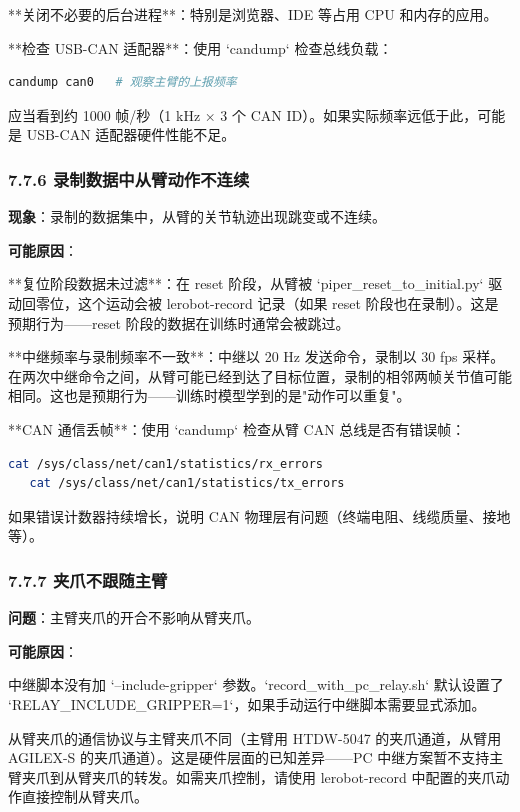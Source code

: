 \documentclass[UTF8,a4paper,11pt]{ctexart}
\begin{document}
{\item[2] **关闭不必要的后台进程**：特别是浏览器、IDE 等占用 CPU 和内存的应用。

\item[3] **检查 USB-CAN 适配器**：使用 `candump` 检查总线负载：
\begin{lstlisting}[language=bash]
   candump can0   # 观察主臂的上报频率
\end{lstlisting}
   应当看到约 1000 帧/秒（1 kHz × 3 个 CAN ID）。如果实际频率远低于此，可能是 USB-CAN 适配器硬件性能不足。

\subsubsection{7.7.6 录制数据中从臂动作不连续}

\textbf{现象}：录制的数据集中，从臂的关节轨迹出现跳变或不连续。

\textbf{可能原因}：

\item[1] **复位阶段数据未过滤**：在 reset 阶段，从臂被 `piper_reset_to_initial.py` 驱动回零位，这个运动会被 lerobot-record 记录（如果 reset 阶段也在录制）。这是预期行为——reset 阶段的数据在训练时通常会被跳过。

\item[2] **中继频率与录制频率不一致**：中继以 20 Hz 发送命令，录制以 30 fps 采样。在两次中继命令之间，从臂可能已经到达了目标位置，录制的相邻两帧关节值可能相同。这也是预期行为——训练时模型学到的是"动作可以重复"。

\item[3] **CAN 通信丢帧**：使用 `candump` 检查从臂 CAN 总线是否有错误帧：
\begin{lstlisting}[language=bash]
   cat /sys/class/net/can1/statistics/rx_errors
   cat /sys/class/net/can1/statistics/tx_errors
\end{lstlisting}
   如果错误计数器持续增长，说明 CAN 物理层有问题（终端电阻、线缆质量、接地等）。

\subsubsection{7.7.7 夹爪不跟随主臂}

\textbf{问题}：主臂夹爪的开合不影响从臂夹爪。

\textbf{可能原因}：
\item[1] 中继脚本没有加 `--include-gripper` 参数。`record_with_pc_relay.sh` 默认设置了 `RELAY_INCLUDE_GRIPPER=1`，如果手动运行中继脚本需要显式添加。
\item[2] 从臂夹爪的通信协议与主臂夹爪不同（主臂用 HTDW-5047 的夹爪通道，从臂用 AGILEX-S 的夹爪通道）。这是硬件层面的已知差异——PC 中继方案暂不支持主臂夹爪到从臂夹爪的转发。如需夹爪控制，请使用 lerobot-record 中配置的夹爪动作直接控制从臂夹爪。

}
\end{document}

